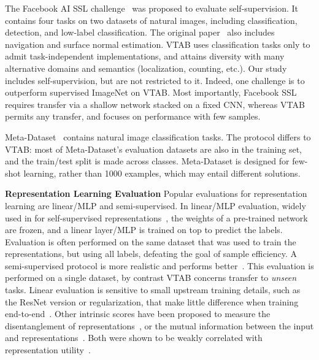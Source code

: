 The Facebook AI SSL challenge~\citep{fai2019} was proposed to evaluate self-supervision. It contains four tasks on two datasets of natural images, including classification, detection, and low-label classification. The original paper~\citep{goyal2019scaling} also includes navigation and surface normal estimation. VTAB uses classification tasks only to admit task-independent implementations, and attains diversity with many alternative domains and semantics (localization, counting, etc.). Our study includes self-supervision, but are not restricted to it. Indeed, one challenge is to outperform supervised ImageNet on VTAB. Most importantly, Facebook SSL requires transfer via a shallow network stacked on a fixed CNN, whereas VTAB permits any transfer, and focuses on performance with few samples.

Meta-Dataset~\citep{triantafillou2019meta} contains natural image classification tasks. The protocol differs to VTAB: most of Meta-Dataset's evaluation datasets are also in the training set, and the train/test split is made across classes. Meta-Dataset is designed for few-shot learning, rather than 1000 examples, which may entail different solutions.

\textbf{Representation Learning Evaluation}\quad
Popular evaluations for representation learning are linear/MLP and semi-supervised. In linear/MLP evaluation, widely used in for self-supervised representations~\citep{doersch2015unsupervised,zhang2016colorful,noroozi2016unsupervised,doersch2017multi}, the weights of a pre-trained network are frozen, and a linear layer/MLP is trained on top to predict the labels. Evaluation is often performed on the same dataset that was used to train the representations, but using all labels, defeating the goal of sample efficiency. A semi-supervised protocol is more realistic and performs better~\citep{zhai2019s4l}. This evaluation is performed on a single dataset, by contrast VTAB concerns transfer to \emph{unseen} tasks. Linear evaluation is sensitive to small upstream training details, such as the ResNet version or regularization, that make little difference when training end-to-end~\citep{kornblith2018better,kolesnikov2019revisiting}. Other intrinsic scores have been proposed to measure the disentanglement of representations~\citep{locatello2018challenging}, or the mutual information between the input and representations~\citep{hjelm2018learning}. Both were shown to be weakly correlated with representation utility~\citep{locatello2018challenging,tschannen2019mutual}.

